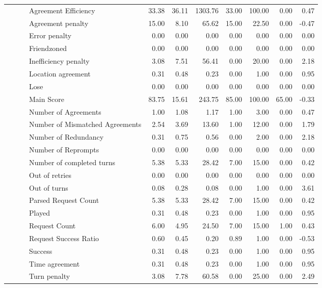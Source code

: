 \begin{tabular}{llllrrrrrrr}
 &  &  & Agreement Efficiency & 33.38 & 36.11 & 1303.76 & 33.00 & 100.00 & 0.00 & 0.47 \\
 &  &  & Agreement penalty & 15.00 & 8.10 & 65.62 & 15.00 & 22.50 & 0.00 & -0.47 \\
 &  &  & Error penalty & 0.00 & 0.00 & 0.00 & 0.00 & 0.00 & 0.00 & 0.00 \\
 &  &  & Friendzoned & 0.00 & 0.00 & 0.00 & 0.00 & 0.00 & 0.00 & 0.00 \\
 &  &  & Inefficiency penalty & 3.08 & 7.51 & 56.41 & 0.00 & 20.00 & 0.00 & 2.18 \\
 &  &  & Location agreement & 0.31 & 0.48 & 0.23 & 0.00 & 1.00 & 0.00 & 0.95 \\
 &  &  & Lose & 0.00 & 0.00 & 0.00 & 0.00 & 0.00 & 0.00 & 0.00 \\
 &  &  & Main Score & 83.75 & 15.61 & 243.75 & 85.00 & 100.00 & 65.00 & -0.33 \\
 &  &  & Number of Agreements & 1.00 & 1.08 & 1.17 & 1.00 & 3.00 & 0.00 & 0.47 \\
 &  &  & Number of Mismatched Agreements & 2.54 & 3.69 & 13.60 & 1.00 & 12.00 & 0.00 & 1.79 \\
 &  &  & Number of Redundancy & 0.31 & 0.75 & 0.56 & 0.00 & 2.00 & 0.00 & 2.18 \\
 &  &  & Number of Reprompts & 0.00 & 0.00 & 0.00 & 0.00 & 0.00 & 0.00 & 0.00 \\
 &  &  & Number of completed turns & 5.38 & 5.33 & 28.42 & 7.00 & 15.00 & 0.00 & 0.42 \\
 &  &  & Out of retries & 0.00 & 0.00 & 0.00 & 0.00 & 0.00 & 0.00 & 0.00 \\
 &  &  & Out of turns & 0.08 & 0.28 & 0.08 & 0.00 & 1.00 & 0.00 & 3.61 \\
 &  &  & Parsed Request Count & 5.38 & 5.33 & 28.42 & 7.00 & 15.00 & 0.00 & 0.42 \\
 &  &  & Played & 0.31 & 0.48 & 0.23 & 0.00 & 1.00 & 0.00 & 0.95 \\
 &  &  & Request Count & 6.00 & 4.95 & 24.50 & 7.00 & 15.00 & 1.00 & 0.43 \\
 &  &  & Request Success Ratio & 0.60 & 0.45 & 0.20 & 0.89 & 1.00 & 0.00 & -0.53 \\
 &  &  & Success & 0.31 & 0.48 & 0.23 & 0.00 & 1.00 & 0.00 & 0.95 \\
 &  &  & Time agreement & 0.31 & 0.48 & 0.23 & 0.00 & 1.00 & 0.00 & 0.95 \\
 &  &  & Turn penalty & 3.08 & 7.78 & 60.58 & 0.00 & 25.00 & 0.00 & 2.49 \\

\end{tabular}
